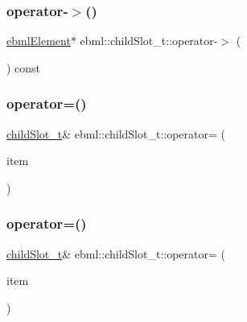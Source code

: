 \mbox{\label{classebml_1_1childSlot__t_a275319c9fc40b9c819f9422602442fc9}} 
\subsubsection{\texorpdfstring{operator-\/$>$()}{operator->()}}
{\footnotesize\ttfamily \mbox{\hyperlink{classebml_1_1ebmlElement}{ebml\+Element}}$\ast$ ebml\+::child\+Slot\+\_\+t\+::operator-\/$>$ (\begin{DoxyParamCaption}{ }\end{DoxyParamCaption}) const}

\mbox{\label{classebml_1_1childSlot__t_a96a35fa33df87f8294679f6e35cc1aa5}} 
\subsubsection{\texorpdfstring{operator=()}{operator=()}\hspace{0.1cm}{\footnotesize\ttfamily [1/3]}}
{\footnotesize\ttfamily \mbox{\hyperlink{classebml_1_1childSlot__t}{child\+Slot\+\_\+t}}\& ebml\+::child\+Slot\+\_\+t\+::operator= (\begin{DoxyParamCaption}\item[{const \mbox{\hyperlink{namespaceebml_adad533b7705a16bb360fe56380c5e7be}{ebml\+Element\+\_\+sp}} \&}]{item }\end{DoxyParamCaption})}

\mbox{\label{classebml_1_1childSlot__t_a5519b06a0a0d2f81a67946a810d2bdbe}} 
\subsubsection{\texorpdfstring{operator=()}{operator=()}\hspace{0.1cm}{\footnotesize\ttfamily [2/3]}}
{\footnotesize\ttfamily \mbox{\hyperlink{classebml_1_1childSlot__t}{child\+Slot\+\_\+t}}\& ebml\+::child\+Slot\+\_\+t\+::operator= (\begin{DoxyParamCaption}\item[{\mbox{\hyperlink{classebml_1_1ebmlElement}{ebml\+Element}} $\ast$}]{item }\end{DoxyParamCaption})}

